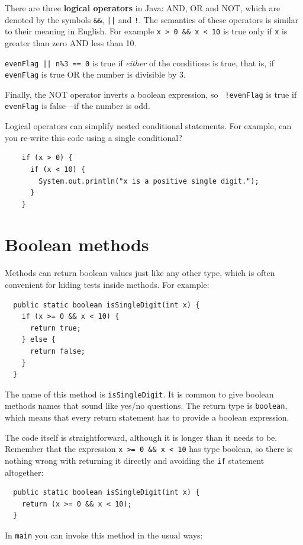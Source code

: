 \documentclass[12pt]{book}
\theoremstyle{exercise}
\begin{document}
There are three {\bf logical operators} in Java: AND, OR and NOT,
which are denoted by the symbols {\tt \&\&}, {\tt ||} and
{\tt !}.  The semantics of these operators is similar
to their meaning in English.  For example {\tt x > 0 \&\& x < 10}
is true only if {\tt x} is greater than zero AND less than 10.

{\tt evenFlag || n\%3 == 0} is true if {\em either} of
the conditions is true, that is, if {\tt evenFlag} is true OR the
number is divisible by 3.

Finally, the NOT operator inverts a boolean expression, so {\tt
  !evenFlag} is true if {\tt evenFlag} is false---if the number is
odd.


Logical operators can simplify nested
conditional statements.  For example, can you re-write
this code using a single conditional?

\begin{lstlisting}
    if (x > 0) {
      if (x < 10) {
        System.out.println("x is a positive single digit.");
      }
    }
\end{lstlisting}


\section{Boolean methods}
\label{boolean}

Methods can return boolean values just like any other type,
which is often convenient for hiding tests inside
methods.  For example:

\begin{lstlisting}
  public static boolean isSingleDigit(int x) {
    if (x >= 0 && x < 10) {
      return true;
    } else {
      return false;
    }
  }
\end{lstlisting}
%
The name of this method is {\tt isSingleDigit}.  It is common
to give boolean methods names that sound like yes/no questions.
The return type is {\tt boolean}, which means that every return
statement has to provide a boolean expression.

The code itself is straightforward, although it is longer than
it needs to be.  Remember that the expression {\tt x >= 0 \&\& x < 10}
has type boolean, so there is nothing wrong with returning it
directly and avoiding the {\tt if} statement altogether:

\begin{lstlisting}
  public static boolean isSingleDigit(int x) {
    return (x >= 0 && x < 10);
  }
\end{lstlisting}
%
In {\tt main} you can invoke this method in the usual ways:
\end{document}
